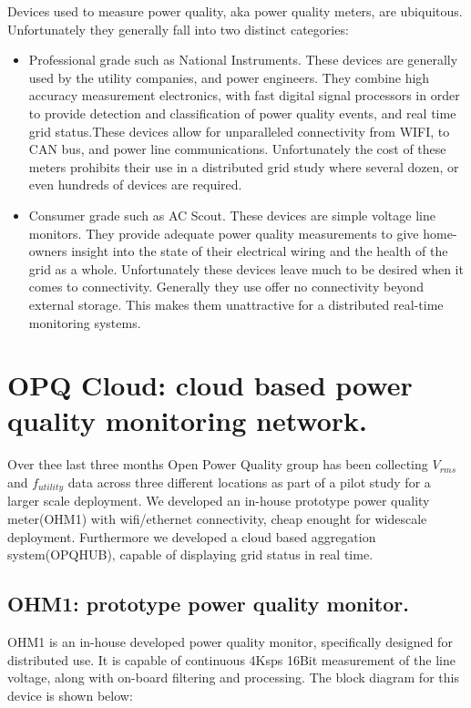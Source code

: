 Devices used to measure power quality, aka power quality meters, are ubiquitous. Unfortunately they generally fall into two distinct categories:
\begin{itemize}
\item Professional grade such as National Instruments. These devices are generally used by the utility companies, and power engineers. They combine high accuracy measurement electronics, with 
fast digital signal processors in order to provide detection and classification of power quality events, and real time grid status.These devices allow for unparalleled connectivity
from WIFI, to CAN bus, and power line communications.  Unfortunately the cost of these meters prohibits their use in a distributed grid study where several dozen, or even hundreds of devices are required.
\item Consumer grade such as AC Scout\textregistered. These devices are simple voltage line monitors. They provide adequate power quality measurements to give home-owners insight into the state of their electrical wiring and the
health of the grid as a whole. Unfortunately these devices leave much to be desired when it comes to connectivity. Generally they use offer no connectivity beyond external storage. This makes them
unattractive for a distributed real-time monitoring systems.
\end{itemize}

\chapter{OPQ Cloud: cloud based power quality monitoring network.}
Over thee last three months Open Power Quality group has been collecting $V_{rms}$ and $f_{utility}$ data across three different locations as part of
a pilot study for a larger scale deployment. We developed an in-house prototype power quality meter(OHM1) with wifi/ethernet connectivity, cheap enought for widescale deployment.
Furthermore we developed a cloud based aggregation system(OPQHUB), capable of displaying grid status in real time.

\section{OHM1: prototype power quality monitor.}

OHM1 is an in-house developed power quality monitor, specifically designed for distributed use. It is capable of continuous  4Ksps 16Bit measurement of the line voltage, along with
on-board filtering and processing. The block diagram for this device is shown below:

